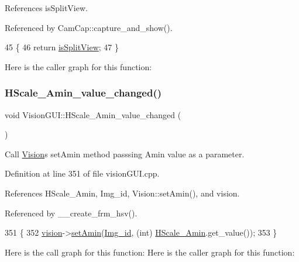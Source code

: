 References is\+Split\+View.



Referenced by Cam\+Cap\+::capture\+\_\+and\+\_\+show().


\begin{DoxyCode}
45                                \{
46   \textcolor{keywordflow}{return} \hyperlink{class_vision_g_u_i_a7706a668c306ffcfbb12fbb16e05f478}{isSplitView};
47 \}
\end{DoxyCode}
Here is the caller graph for this function\+:
\mbox{\label{class_vision_g_u_i_a5ac13b6caa3cef4ddc8137c432b645ba}} 
\subsubsection{\texorpdfstring{H\+Scale\+\_\+\+Amin\+\_\+value\+\_\+changed()}{HScale\_Amin\_value\_changed()}}
{\footnotesize\ttfamily void Vision\+G\+U\+I\+::\+H\+Scale\+\_\+\+Amin\+\_\+value\+\_\+changed (\begin{DoxyParamCaption}{ }\end{DoxyParamCaption})\hspace{0.3cm}{\ttfamily [private]}}



Call \hyperlink{class_vision}{Vision}\textquotesingle{}s set\+Amin method passsing Amin value as a parameter. 



Definition at line 351 of file vision\+G\+U\+I.\+cpp.



References H\+Scale\+\_\+\+Amin, Img\+\_\+id, Vision\+::set\+Amin(), and vision.



Referenced by \+\_\+\+\_\+create\+\_\+frm\+\_\+hsv().


\begin{DoxyCode}
351                                           \{
352     \hyperlink{class_vision_g_u_i_a36aba058af844ec6cbe0c945c616cd5f}{vision}->\hyperlink{class_vision_a15483736197991fac542022fd9652472}{setAmin}(\hyperlink{class_vision_g_u_i_a4a46f114bc58e0f1d56b655f4bc8f9d8}{Img\_id}, (\textcolor{keywordtype}{int}) \hyperlink{class_vision_g_u_i_a72d3a4fe84821ceafeb4293f196aacd7}{HScale\_Amin}.get\_value());
353 \}
\end{DoxyCode}
Here is the call graph for this function\+:
Here is the caller graph for this function\+:
\mbox{\label{class_vision_g_u_i_a2f959701d835dd3fb53b20698754c013}} 
